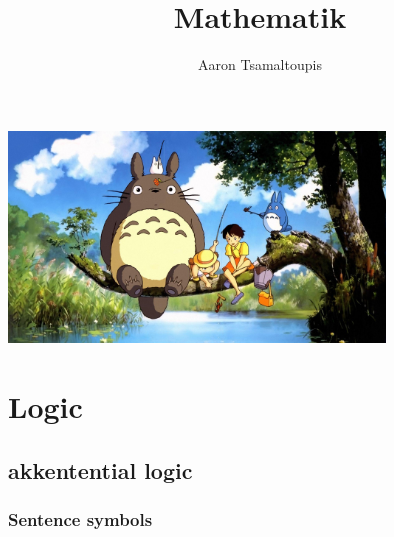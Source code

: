 \documentclass[12pt, letterpaper]{article}
\title{Mathematik}
\author{Aaron Tsamaltoupis}
\begin{document}
\maketitle
	\begin{center}
\includegraphics[width = 10cm]{graphics/ghibli wallpaper all characters.jpg}
\end{center}
\newpage
\tableofcontents
\newpage
\section{Logic}
\label{sec:logic}
\subsection{akkentential logic}
\label{sec:sentential logic}
\subsubsection{Sentence symbols}
\label{sec:Sentence symbols}
\end{document}
